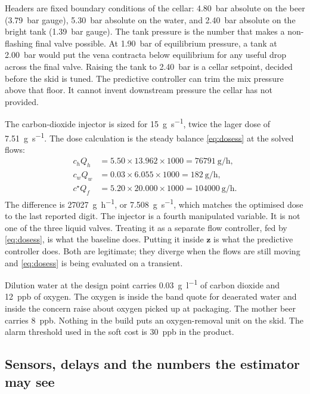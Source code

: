 Headers are fixed boundary conditions of the cellar: \SI{4.80}{bar} absolute on the beer (\SI{3.79}{bar} gauge), \SI{5.30}{bar} absolute on the water, and \SI{2.40}{bar} absolute on the bright tank (\SI{1.39}{bar} gauge). The tank pressure is the number that makes a non-flashing final valve possible. At \SI{1.90}{bar} of equilibrium pressure, a tank at \SI{2.00}{bar} would put the vena contracta below equilibrium for any useful drop across the final valve. Raising the tank to \SI{2.40}{bar} is a cellar setpoint, decided before the skid is tuned. The predictive controller can trim the mix pressure above that floor. It cannot invent downstream pressure the cellar has not provided.

The carbon-dioxide injector is sized for \SI{15}{\gram\per\second}, twice the lager dose of \SI{7.51}{\gram\per\second}. The dose calculation is the steady balance \eqref{eq:dosess} at the solved flows:
\begin{align*}
c_h Q_h &= 5.50 \times 13.962 \times 1000 = \SI{76791}{\gram\per\hour},\\
c_w Q_w &= 0.03 \times 6.055 \times 1000 = \SI{182}{\gram\per\hour},\\
c^{\star} Q_f &= 5.20 \times 20.000 \times 1000 = \SI{104000}{\gram\per\hour}.
\end{align*}
The difference is \SI{27027}{\gram\per\hour}, or \SI{7.508}{\gram\per\second}, which matches the optimised dose to the last reported digit. The injector is a fourth manipulated variable. It is not one of the three liquid valves. Treating it as a separate flow controller, fed by \eqref{eq:dosess}, is what the baseline does. Putting it inside $\mathbf{z}$ is what the predictive controller does. Both are legitimate; they diverge when the flows are still moving and \eqref{eq:dosess} is being evaluated on a transient.

Dilution water at the design point carries \SI{0.03}{\gram\per\litre} of carbon dioxide and \SI{12}{ppb} of oxygen. The oxygen is inside the band \citet{corosysweb} quote for deaerated water and inside the concern \citet{palmer2013} raise about oxygen picked up at packaging. The mother beer carries \SI{8}{ppb}. Nothing in the build puts an oxygen-removal unit on the skid. The alarm threshold used in the soft cost is \SI{30}{ppb} in the product.

\subsection{Sensors, delays and the numbers the estimator may see}

